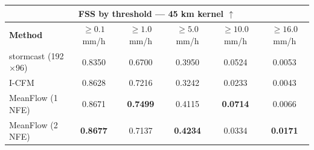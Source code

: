 \documentclass[border=10pt]{standalone}
\begin{document}
\begin{tabular}{lccccc}
\toprule
\multicolumn{6}{c}{\textbf{FSS by threshold — 45 km kernel} $\uparrow$} \\
\midrule
\textbf{Method} & $\geq 0.1$ mm/h & $\geq 1.0$ mm/h & $\geq 5.0$ mm/h & $\geq 10.0$ mm/h & $\geq 16.0$ mm/h \\
\midrule
stormcast (192$\times$96) & 0.8350 & 0.6700 & 0.3950 & 0.0524 & 0.0053 \\
I-CFM & 0.8628 & 0.7216 & 0.3242 & 0.0233 & 0.0043 \\
MeanFlow (1 NFE) & 0.8671 & \textbf{0.7499} & 0.4115 & \textbf{0.0714} & 0.0066 \\
MeanFlow (2 NFE) & \textbf{0.8677} & 0.7137 & \textbf{0.4234} & 0.0334 & \textbf{0.0171} \\
\bottomrule
\end{tabular}
\end{document}
